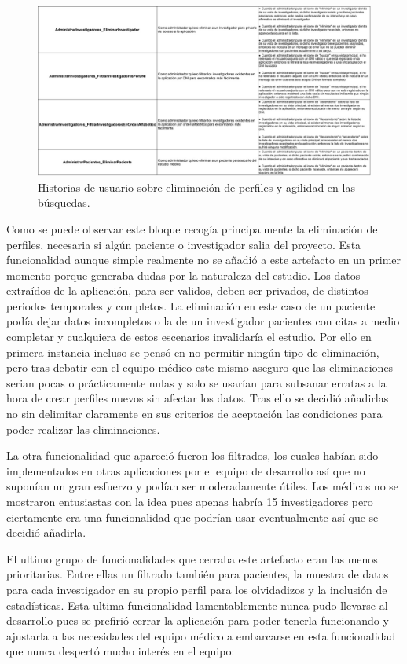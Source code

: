  \begin{figure}[h]
    \centering
     \includegraphics[width=1\textwidth]{images/historiasUsuario-4.jpg}
    \caption{Historias de usuario sobre eliminación de perfiles y agilidad en las búsquedas.}
\end{figure}

Como se puede observar este bloque recogía principalmente la eliminación de perfiles, necesaria si algún paciente o investigador salia del proyecto. Esta funcionalidad aunque simple realmente no se añadió a este artefacto en un primer momento porque generaba dudas por la naturaleza del estudio. Los datos extraídos de la aplicación, para ser validos, deben ser privados, de distintos periodos temporales y completos. La eliminación en este caso de un paciente podía dejar datos incompletos o la de un investigador pacientes con citas a medio completar y cualquiera de estos escenarios invalidaría el estudio. Por ello en primera instancia incluso se pensó en no permitir ningún tipo de eliminación, pero tras debatir con el equipo médico este mismo aseguro que las eliminaciones serian pocas o prácticamente nulas y solo se usarían para subsanar erratas a la hora de crear perfiles nuevos sin afectar los datos. Tras ello se decidió añadirlas no sin delimitar claramente en sus criterios de aceptación las condiciones para poder realizar las eliminaciones.
\newline

La otra funcionalidad que apareció fueron los filtrados, los cuales habían sido implementados en otras aplicaciones por el equipo de desarrollo así que no suponían un gran esfuerzo y podían ser moderadamente útiles. Los médicos no se mostraron entusiastas con la idea pues apenas habría 15 investigadores pero ciertamente era una funcionalidad que podrían usar eventualmente así que se decidió añadirla.
\newpage

El ultimo grupo de funcionalidades que cerraba este artefacto eran las menos prioritarias. Entre ellas un filtrado también para pacientes, la muestra de datos para cada investigador en su propio perfil para los olvidadizos y la inclusión de estadísticas. Esta ultima funcionalidad lamentablemente nunca pudo llevarse al desarrollo pues se prefirió cerrar la aplicación para poder tenerla funcionando y ajustarla a las necesidades del equipo médico a embarcarse en esta funcionalidad que nunca despertó mucho interés en el equipo:
\newline

